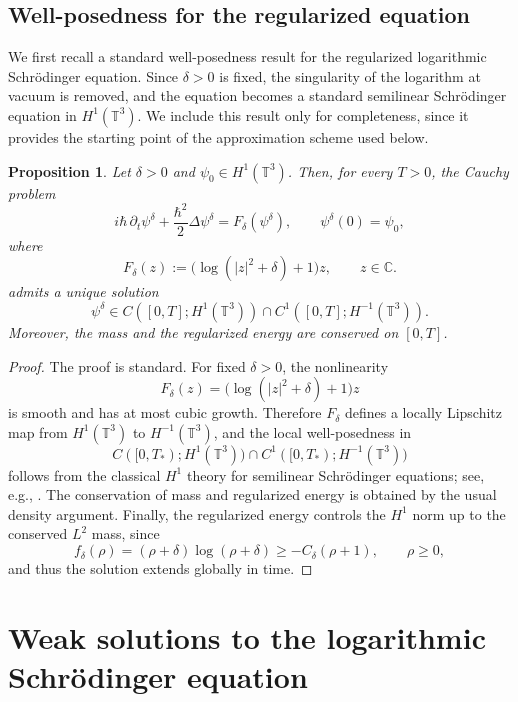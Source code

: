 \documentclass[11pt]{article}
\newtheorem{proposition}{Proposition}
\begin{document}
\subsection{Well-posedness for the regularized equation}

We first recall a standard well-posedness result for the regularized logarithmic Schr\"odinger equation. Since $\delta>0$ is fixed, the singularity of the logarithm at vacuum is removed, and the equation becomes a standard semilinear Schr\"odinger equation in $H^1(\mathbb{T}^3)$. We include this result only for completeness, since it provides the starting point of the approximation scheme used below.

\begin{proposition}\label{prop:global-H1-reglogNLS}
Let $\delta>0$ and $\psi_0\in H^1(\mathbb{T}^3)$. Then, for every $T>0$, the Cauchy problem
 \begin{equation}\label{eq:reglogNLS-wp}
i\hbar\,\partial_t\psi^\delta+\frac{\hbar^2}{2}\Delta\psi^\delta
=
F_\delta(\psi^\delta),
\qquad
\psi^\delta(0)=\psi_0,
\end{equation}
where
\[
F_\delta(z):=\bigl(\log(|z|^2+\delta)+1\bigr)z,
\qquad z\in\mathbb{C}.
\]
admits  a unique solution
\[
\psi^\delta\in C([0,T];H^1(\mathbb{T}^3))
\cap C^1([0,T];H^{-1}(\mathbb{T}^3)).
\]
Moreover, the mass and the regularized energy are conserved on $[0,T]$.
\end{proposition}

\begin{proof}
The proof is standard. For fixed $\delta>0$, the nonlinearity
\[
F_\delta(z)=\bigl(\log(|z|^2+\delta)+1\bigr)z
\]
is smooth and has at most cubic growth. Therefore $F_\delta$ defines a locally Lipschitz map from $H^1(\mathbb{T}^3)$ to $H^{-1}(\mathbb{T}^3)$, and the local well-posedness in
\[
C([0,T_*);H^1(\mathbb{T}^3))\cap C^1([0,T_*);H^{-1}(\mathbb{T}^3))
\]
follows from the classical $H^1$ theory for semilinear Schr\"odinger equations; see, e.g., \cite{Cazenave2003}. The conservation of mass and regularized energy is obtained by the usual density argument. Finally, the regularized energy controls the $H^1$ norm up to the conserved $L^2$ mass, since
\[
f_\delta(\rho)=(\rho+\delta)\log(\rho+\delta)\ge -C_\delta(\rho+1),
\qquad \rho\ge0,
\]
and thus the solution extends globally in time.
\end{proof}





\section{Weak solutions to the logarithmic Schr\"odinger equation} \label{weak solution}
\end{document}
